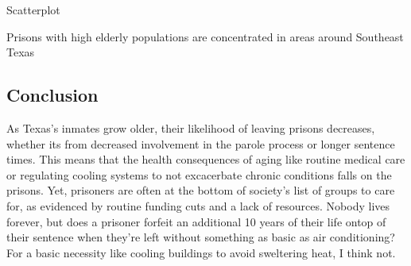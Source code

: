 \documentclass[
  letterpaper,
  DIV=11,
  numbers=noendperiod]{scrartcl}
\begin{document}
Scatterplot

Prisons with high elderly populations are concentrated in areas around
Southeast Texas

\subsection{Conclusion}\label{conclusion}

As Texas's inmates grow older, their likelihood of leaving prisons
decreases, whether its from decreased involvement in the parole process
or longer sentence times. This means that the health consequences of
aging like routine medical care or regulating cooling systems to not
excacerbate chronic conditions falls on the prisons. Yet, prisoners are
often at the bottom of society's list of groups to care for, as
evidenced by routine funding cuts and a lack of resources. Nobody lives
forever, but does a prisoner forfeit an additional 10 years of their
life ontop of their sentence when they're left without something as
basic as air conditioning? For a basic necessity like cooling buildings
to avoid sweltering heat, I think not.
\end{document}
